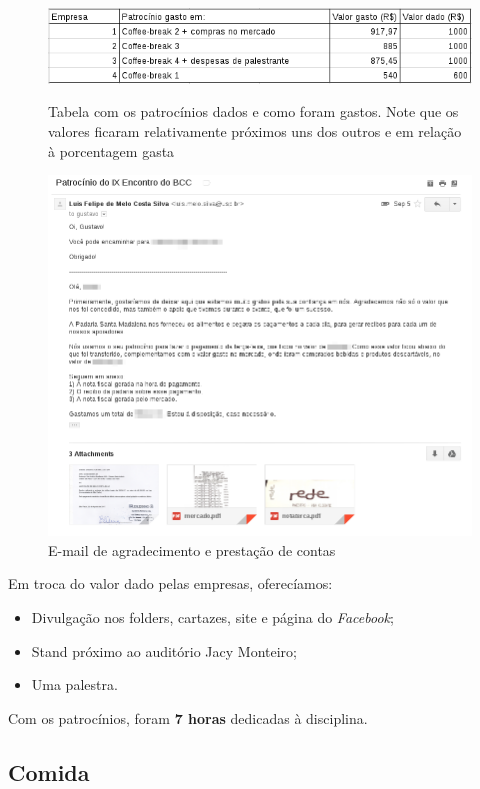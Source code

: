 \documentclass[12pt,letterpaper]{article}
\begin{document}
	\begin{figure}
		\begin{center}
			\includegraphics[scale=0.43]{tabela.png} 
			\caption{Tabela com os patrocínios dados e como foram gastos. Note que os valores ficaram relativamente próximos uns dos outros e em relação à porcentagem gasta} 
			\includegraphics[scale=0.43]{conta.png} 
			\caption{E-mail de agradecimento e prestação de contas}
		\end{center}
	\end{figure}
	
	Em troca do valor dado pelas empresas, oferecíamos:
	
	\begin{itemize}
		\item Divulgação nos folders, cartazes, site e página do \textit{Facebook};
		\item Stand próximo ao auditório Jacy Monteiro;
		\item Uma palestra.
	\end{itemize}
	
	Com os patrocínios, foram \textbf{7 horas} dedicadas à disciplina.
	
	\subsection{Comida}
	
\end{document}
